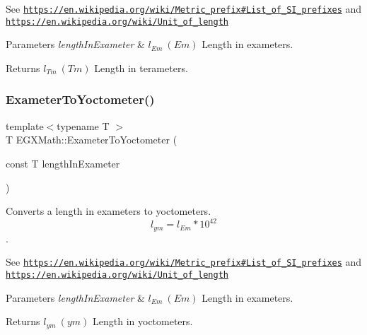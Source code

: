 See \href{https://en.wikipedia.org/wiki/Metric_prefix#List_of_SI_prefixes}{\tt https\+://en.\+wikipedia.\+org/wiki/\+Metric\+\_\+prefix\#\+List\+\_\+of\+\_\+\+S\+I\+\_\+prefixes} and \href{https://en.wikipedia.org/wiki/Unit_of_length}{\tt https\+://en.\+wikipedia.\+org/wiki/\+Unit\+\_\+of\+\_\+length} 
\begin{DoxyParams}{Parameters}
{\em length\+In\+Exameter} & $ l_{Em}\ (Em)$ Length in exameters. \\
\hline
\end{DoxyParams}
\begin{DoxyReturn}{Returns}
$ l_{Tm}\ (Tm)$ Length in terameters. 
\end{DoxyReturn}
\mbox{\label{group___e_g_x_math-_conversions-_length_conversions-_exameter-_s_i_ga0da838a3aa4a2f6ee53687aa346f80ef}} 
\subsubsection{\texorpdfstring{Exameter\+To\+Yoctometer()}{ExameterToYoctometer()}}
{\footnotesize\ttfamily template$<$typename T $>$ \\
T E\+G\+X\+Math\+::\+Exameter\+To\+Yoctometer (\begin{DoxyParamCaption}\item[{const T}]{length\+In\+Exameter }\end{DoxyParamCaption})}



Converts a length in exameters to yoctometers. \[ l_{ym}=l_{Em} * 10^{42} \]. 

See \href{https://en.wikipedia.org/wiki/Metric_prefix#List_of_SI_prefixes}{\tt https\+://en.\+wikipedia.\+org/wiki/\+Metric\+\_\+prefix\#\+List\+\_\+of\+\_\+\+S\+I\+\_\+prefixes} and \href{https://en.wikipedia.org/wiki/Unit_of_length}{\tt https\+://en.\+wikipedia.\+org/wiki/\+Unit\+\_\+of\+\_\+length} 
\begin{DoxyParams}{Parameters}
{\em length\+In\+Exameter} & $ l_{Em}\ (Em)$ Length in exameters. \\
\hline
\end{DoxyParams}
\begin{DoxyReturn}{Returns}
$ l_{ym}\ (ym)$ Length in yoctometers. 
\end{DoxyReturn}
\mbox{\label{group___e_g_x_math-_conversions-_length_conversions-_exameter-_s_i_ga052b009f7705d8ad81083116d15dec65}} 

